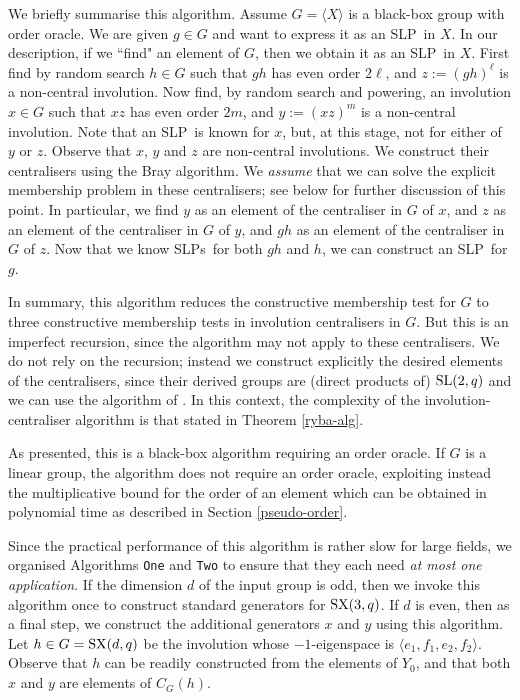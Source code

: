 \documentclass[12pt]{article}
\def\SL{{\rm SL}}
\def\SX{{\rm SX}}
\def\SLP{{\rm SLP}}
\def\SLPs{{\rm SLPs}}
\begin{document}
We briefly summarise this algorithm.  
Assume $G = \langle X \rangle$ is a black-box group
with order oracle. We are given 
$g \in G$ and want to express it as an \SLP\ in $X$.
In our description, if we ``find" an element of $G$, then we 
obtain it as an \SLP\ in $X$.
First find by random search $h\in G$ such that
$gh$ has even order $2\ell$, and $z:=(gh)^\ell$ is a non-central
involution. Now  find, by random search and powering, an involution
$x\in G$ such that $xz$ has even order $2m$, and $y:=(xz)^m$ is a
non-central involution. Note that an \SLP\ is known for $x$, but, at this
stage, not for either of $y$ or $z$. 
Observe that $x$, $y$ and $z$ are non-central involutions. 
We construct their centralisers using the Bray algorithm.
We {\it assume} that we can  solve the explicit membership problem 
in these centralisers; see below for further discussion of this point.
In particular, we find $y$ as an element of the centraliser in $G$ of $x$, 
and $z$ as an
element of the centraliser in $G$ of $y$, and $gh$ as an element of the
centraliser in $G$ of $z$. Now that we know \SLPs\ for both $gh$ and 
$h$, we can construct an \SLP\ for $g$.

In summary, this algorithm reduces the constructive
membership test for $G$ to three constructive membership  tests  in involution
centralisers in $G$.  But  this is an imperfect recursion, since  the 
algorithm may not apply to these centralisers. 
We do not rely on the recursion; instead we construct
explicitly the desired elements of the centralisers, 
since their derived groups are (direct products of) $\SL(2,q)$
and we can use the algorithm of \cite{Conderetal05}.
In this context, the complexity of the involution-centraliser
algorithm is that stated in Theorem \ref{ryba-alg}.

As presented, this is a black-box algorithm  requiring an order oracle.
If $G$ is a linear group, the algorithm does not require 
an order oracle, exploiting instead the multiplicative 
bound for the order of an element which can
be obtained in polynomial time as described in Section \ref{pseudo-order}.

Since the practical performance of
this algorithm is rather slow for large fields,
we organised Algorithms {\tt One} and {\tt Two}
to ensure that they each need {\it at most one application}. 
If the dimension $d$ of the input group is odd, then we invoke 
this algorithm 
once to construct standard generators for $\SX(3, q)$. 
If $d$ is even, then as a final step, we construct the additional generators 
$x$ and $y$ using this algorithm. 
Let $h \in G=\SX(d, q)$ be the involution whose $-1$-eigenspace
is $\langle e_1, f_1, e_2, f_2 \rangle$. 
Observe that $h$ 
can be readily constructed from the elements of $Y_0$, 
and that both $x$ and $y$ are elements of $C_G(h)$. 
\end{document}
